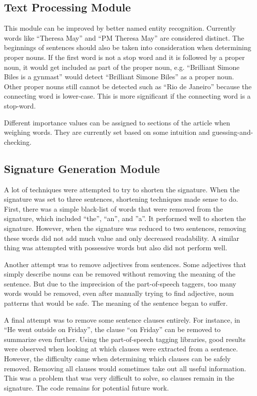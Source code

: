 \documentclass[11pt,titlepage]{report}
\begin{document}
\subsection{Text Processing Module}
This module can be improved by better named entity recognition. Currently words like ``Theresa May'' and ``PM Theresa May'' are considered distinct. The beginnings of sentences should also be taken into consideration when determining proper nouns. If the first word is not a stop word and it is followed by a proper noun, it would get included as part of the proper noun, e.g. ``Brilliant Simone Biles is a gynmast'' would detect ``Brilliant Simone Biles'' as a proper noun. Other proper nouns still cannot be detected such as ``Rio de Janeiro'' because the connecting word is lower-case. This is more significant if the connecting word is a stop-word.

Different importance values can be assigned to sections of the article when weighing words. They are currently set based on some intuition and guessing-and-checking.
\subsection{Signature Generation Module}
A lot of techniques were attempted to try to shorten the signature. When the signature was set to three sentences, shortening techniques made sense to do. First, there was a simple black-list of words that were removed from the signature, which included ``the'', ``an'', and ''a''. It performed well to shorten the signature. However, when the signature was reduced to two sentences, removing these words did not add much value and only decreased readability. A similar thing was attempted with possessive words but also did not perform well. 

Another attempt was to remove adjectives from sentences. Some adjectives that simply describe nouns can be removed without removing the meaning of the sentence. But due to the imprecision of the part-of-speech taggers, too many words would be removed, even after manually trying to find adjective, noun patterns that would be safe. The meaning of the sentence began to suffer. 

A final attempt was to remove some sentence clauses entirely. For instance, in ``He went outside on Friday'', the clause ``on Friday'' can be removed to summarize even further. Using the part-of-speech tagging libraries, good results were observed when looking at which clauses were extracted from a sentence. However, the difficulty came when determining which clauses can be safely removed. Removing all clauses would sometimes take out all useful information. This was a problem that was very difficult to solve, so clauses remain in the signature. The code remains for potential future work.
\end{document}
